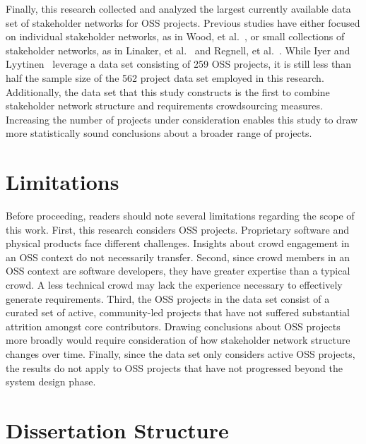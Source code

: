 Finally, this research collected and analyzed the largest currently available data set of stakeholder networks for OSS projects. Previous studies have either focused on individual stakeholder networks, as in Wood, et al.~\cite{wood}, or small collections of stakeholder networks, as in Linaker, et al.~\cite{linaker} and Regnell, et al.~\cite{regnell}. While Iyer and Lyytinen~\cite{iyer} leverage a data set consisting of 259 OSS projects, it is still less than half the sample size of the 562 project data set employed in this research. Additionally, the data set that this study constructs is the first to combine stakeholder network structure and requirements crowdsourcing measures. Increasing the number of projects under consideration enables this study to draw more statistically sound conclusions about a broader range of projects.

\section{Limitations}

Before proceeding, readers should note several limitations regarding the scope of this work. First, this research considers OSS projects. Proprietary software and physical products face different challenges. Insights about crowd engagement in an OSS context do not necessarily transfer. Second, since crowd members in an OSS context are software developers, they have greater expertise than a typical crowd. A less technical crowd may lack the experience necessary to effectively generate requirements. Third, the OSS projects in the data set consist of a curated set of active, community-led projects that have not suffered substantial attrition amongst core contributors. Drawing conclusions about OSS projects more broadly would require consideration of how stakeholder network structure changes over time. Finally, since the data set only considers active OSS projects, the results do not apply to OSS projects that have not progressed beyond the system design phase. 

\section{Dissertation Structure}

